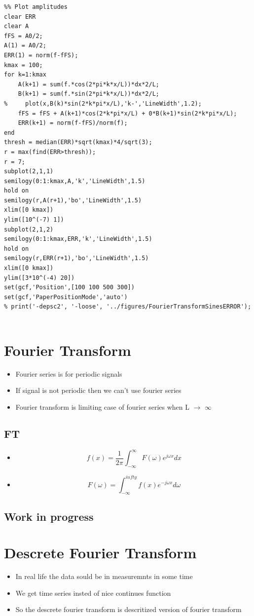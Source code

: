 \documentclass[11pt]{article}
\begin{document}
\begin{verbatim}
%% Plot amplitudes
clear ERR
clear A
fFS = A0/2;
A(1) = A0/2;
ERR(1) = norm(f-fFS);
kmax = 100;
for k=1:kmax
    A(k+1) = sum(f.*cos(2*pi*k*x/L))*dx*2/L;
    B(k+1) = sum(f.*sin(2*pi*k*x/L))*dx*2/L;
%     plot(x,B(k)*sin(2*k*pi*x/L),'k-','LineWidth',1.2);
    fFS = fFS + A(k+1)*cos(2*k*pi*x/L) + 0*B(k+1)*sin(2*k*pi*x/L);
    ERR(k+1) = norm(f-fFS)/norm(f);
end
thresh = median(ERR)*sqrt(kmax)*4/sqrt(3);
r = max(find(ERR>thresh));
r = 7;
subplot(2,1,1)
semilogy(0:1:kmax,A,'k','LineWidth',1.5)
hold on
semilogy(r,A(r+1),'bo','LineWidth',1.5)
xlim([0 kmax])
ylim([10^(-7) 1])
subplot(2,1,2)
semilogy(0:1:kmax,ERR,'k','LineWidth',1.5)
hold on
semilogy(r,ERR(r+1),'bo','LineWidth',1.5)
xlim([0 kmax])
ylim([3*10^(-4) 20])
set(gcf,'Position',[100 100 500 300])
set(gcf,'PaperPositionMode','auto')
% print('-depsc2', '-loose', '../figures/FourierTransformSinesERROR');


\end{verbatim}
\section{Fourier Transform}
\label{sec:org1dbe9df}
\begin{itemize}
\item Fourier series is for periodic signals
\item If signal is not periodic then we can't use fourier series
\item Fourier transform is limiting case of fourier series when L \(\to\) \(\infty\)
\end{itemize}
\subsection{FT}
\label{sec:org296793f}
\begin{itemize}
\item \[ f(x) = \frac{1}{2\pi} \int_{-\infty}^{\infty} F(\omega)e^{j\omega x} dx \]
\item \[ F(\omega) = \int_{-\infty}^{infty} f(x)e^{-j\omega x} d\omega \]
\end{itemize}
\subsection{Work in progress}
\label{sec:org12d647e}
\section{Descrete Fourier Transform}
\label{sec:org7226e7b}
\begin{itemize}
\item In real life the data sould be in measuremnts in some time
\item We get time series insted of nice continues function
\item So the descrete fourier transform is descritized version of fourier transform
\end{itemize}
\end{document}

